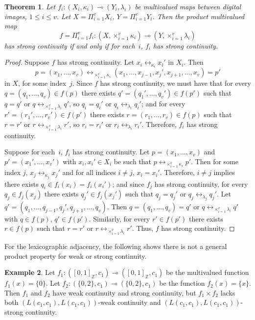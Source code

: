\documentclass{article}
\theoremstyle{plain}
\newtheorem{thm}{Theorem}
\theoremstyle{definition}
\newtheorem{exl}[thm]{Example}
\numberwithin{thm}{section}
\newcommand{\adj}{\leftrightarrow}
\def\Z{{\mathbb Z}}
\begin{document}
\begin{thm}
\label{strong-Cart-prod-implies-factor}
Let $f_i: (X_i,\kappa_i) \multimap (Y_i,\lambda_i)$ be
multivalued maps between digital
images, $1 \le i \le v$.
Let $X=\Pi_{i=1}^v X_i$, $Y=\Pi_{i=1}^v Y_i$.
Then the product multivalued map
\[ f=\Pi_{i=1}^v f_i: (X, \times_{i=1}^v \kappa_i) \multimap (Y, \times_{i=1}^v \lambda_i) \]
has strong continuity if and
only if for each~$i$,
$f_i$ has strong continuity.
\end{thm}

\begin{proof}
Suppose $f$ has strong continuity.
Let $x_i \adj_{\kappa_i} x_i'$ in
$X_i$. Then
\[ p=(x_1,\ldots,x_v) \adj_{\times_{i=1}^v \kappa_i}
(x_1,\ldots,x_{j-1},x_j',x_{j+1},\ldots,x_v)=p'
\]
in $X$, for some index~$j$. Since $f$ has strong
continuity, we must have that for
every $q=(q_1,\ldots,q_v)\in f(p)$ there exists $q'=(q_1',\ldots,q_v') \in f(p')$ such that
$q = q'$ or $q \adj_{\times_{i=1}^v \lambda_i} q'$, so $q_i=q_i'$ or $q_i \adj_{\lambda_i} q_i'$; and for every
$r'=(r_1',\ldots,r_v') \in f(p')$ there exists
$r=(r_1,\ldots,r_v) \in f(p)$
such that $r=r'$ or
$r \adj_{\times_{i=1}^v \lambda_i} r'$, so $r_i=r_i'$ or $r_i \adj_{\lambda_i} r_i'$.
Therefore, $f_i$ has strong continuity.

Suppose for each~$i$, $f_i$ has
strong continuity. Let
$p=(x_1,\ldots, x_v)$ and 
$p'=(x_1',\ldots, x_v')$ with
$x_i,x_i' \in X_i$ be such that
$p \adj_{\times_{i=1}^v \kappa_i} p'$. Then for some
index $j$, $x_j \adj_{\kappa_j} x_j'$ and for all indices $i \neq j$, $x_i = x_i'$. Therefore,
$i \neq j$ implies there exists $q_i \in f_i(x_i)=f_i(x_i')$; and since
$f_j$ has strong continuity, for
every $q_j \in f_j(x_j)$ there
exists $q_j' \in f_j(x_j')$ such that $q_j=q_j'$ or $q_j \adj_{\lambda_j} q_j'$.
Let $q'=(q_1,\ldots,q_{j-1},q_j',q_{j+1},\ldots,q_v)$. Then
$q =(q_1, \ldots, q_v) =
q'$ or $q \adj_{\times_{i=1}^v \lambda_i} q'$ with $q \in f(p)$, $q' \in f(p')$. Similarly, for every $r' \in f(p')$ there exists
$r \in f(p)$ such that $r=r'$
or $r \adj_{\times_{i=1}^v \lambda_i} r'$.
Thus, $f$ has strong continuity.
\end{proof}

For the lexicographic adjacency,
the following shows there is not a
general product property for
weak or strong continuity.

\begin{exl}
\label{lex-weakStrong-exl}
Let $f_1: ([0,1]_{\Z},c_1) \multimap ([0,1]_{\Z},c_1)$ be
the multivalued function $f_1(x)=\{0\}$. Let $f_2: (\{0,2\},c_1) \multimap (\{0,2\},c_1)$ be the function
$f_2(x)=\{x\}$. Then $f_1$ and $f_2$ have weak continuity and strong continuity, but
$f_1 \times f_2$ lacks both $(L(c_1,c_1),L(c_1,c_1))$-weak continuity and $(L(c_1,c_1),L(c_1,c_1))$-strong continuity.
\end{exl}
\end{document}

